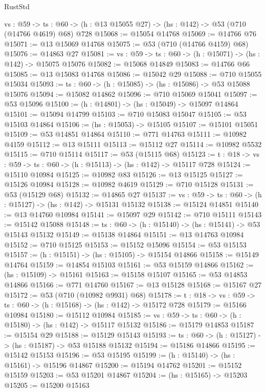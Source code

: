 \begin{lexlean}{RustStd}
\begin{coremodule}
  {vs : @59} ->
  {ts : @60} -> (h : @13 @15055 @27) -> (hs : @142) -> @53 (@710 (@14766 @4619) @68) @728
@15068 := @15054 @14768
@15069 := @14766 @76
@15071 := @13 @15069 @14768
@15075 := @53 (@710 (@14766 @4159) @68)
@15076 := @14863 @27
@15081 := {vs : @59} -> {ts : @60} -> (h : @15071) -> (hs : @142) -> @15075 @15076
@15082 := @15068 @14849
@15083 := @14766 @66
@15085 := @13 @15083 @14768
@15086 := @15042 @29
@15088 := @710 @15055 @15034
@15093 := {ts : @60} -> (h : @15085) -> (hs : @15086) -> @53 @15088 @15076
@15094 := @15082 @14862
@15096 := @710 @15069 @15041
@15097 := @53 @15096
@15100 := (h : @14801) -> (hs : @15049) -> @15097 @14864
@15101 := @15094 @14799
@15103 := @710 @15083 @15047
@15105 := @53 @15103 @14864
@15106 := (hs : @15053) -> @15105
@15107 := @15101 @15051
@15109 := @53 @14851 @14864
@15110 := @771 @14763
@15111 := @10982 @4159
@15112 := @13 @15111
@15113 := @15112 @27
@15114 := @10982 @5532
@15115 := @710 @15114
@15117 := @53 (@15115 @68)
@15123 := {t : @18} -> {vs : @59} -> {ts : @60} -> (h : @15113) -> (hs : @142) -> @15117 @728
@15124 := @15110 @10984
@15125 := @10982 @83
@15126 := @13 @15125
@15127 := @15126 @10984
@15128 := @10982 @4619
@15129 := @710 @15128
@15131 := @53 (@15129 @68)
@15132 := @14865 @27
@15137 := {vs : @59} -> {ts : @60} -> (h : @15127) -> (hs : @142) -> @15131 @15132
@15138 := @15124 @14851
@15140 := @13 @14760 @10984
@15141 := @15097 @29
@15142 := @710 @15111
@15143 := @15142 @15088
@15148 := {ts : @60} -> (h : @15140) -> (hs : @15141) -> @53 @15143 @15132
@15149 := @15138 @14864
@15151 := @13 @14763 @10984
@15152 := @710 @15125
@15153 := @15152 @15096
@15154 := @53 @15153
@15157 := (h : @15151) -> (hs : @15105) -> @15154 @14866
@15158 := @15149 @14764
@15159 := @14854 @15103
@15161 := @53 @15159 @14866
@15162 := (hs : @15109) -> @15161
@15163 := @15158 @15107
@15165 := @53 @14853 @14866
@15166 := @771 @14760
@15167 := @13 @15128
@15168 := @15167 @27
@15172 := @53 (@710 (@10982 @9931) @68)
@15178 := {t : @18} -> {vs : @59} -> {ts : @60} -> (h : @15168) -> (hs : @142) -> @15172 @728
@15179 := @15166 @10984
@15180 := @15112 @10984
@15185 := {vs : @59} -> {ts : @60} -> (h : @15180) -> (hs : @142) -> @15117 @15132
@15186 := @15179 @14853
@15187 := @15154 @29
@15188 := @15129 @15143
@15193 := {ts : @60} -> (h : @15127) -> (hs : @15187) -> @53 @15188 @15132
@15194 := @15186 @14866
@15195 := @15142 @15153
@15196 := @53 @15195
@15199 := (h : @15140) -> (hs : @15161) -> @15196 @14867
@15200 := @15194 @14762
@15201 := @15152 @15159
@15203 := @53 @15201 @14867
@15204 := (hs : @15165) -> @15203
@15205 := @15200 @15163

\end{coremodule}
\end{lexlean}
